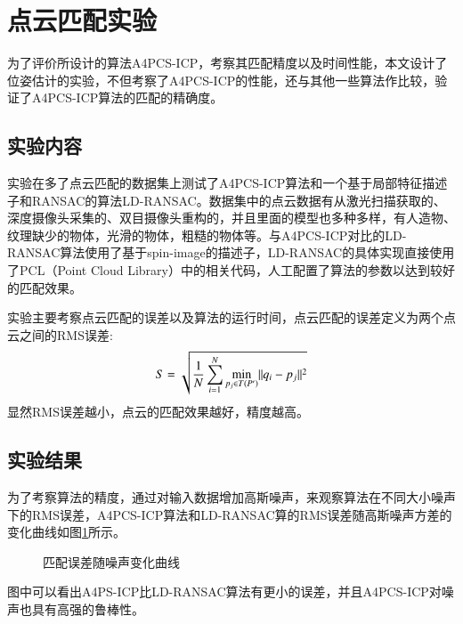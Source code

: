 \section{点云匹配实验}
为了评价所设计的算法A4PCS-ICP，考察其匹配精度以及时间性能，本文设计了位姿估计的实验，不但考察了A4PCS-ICP的性能，还与其他一些算法作比较，验证了A4PCS-ICP算法的匹配的精确度。

\subsection{实验内容}
实验在多了点云匹配的数据集上测试了A4PCS-ICP算法和一个基于局部特征描述子和RANSAC的算法LD-RANSAC\cite{li2005multiscale}。数据集中的点云数据有从激光扫描获取的、深度摄像头采集的、双目摄像头重构的，并且里面的模型也多种多样，有人造物、纹理缺少的物体，光滑的物体，粗糙的物体等。与A4PCS-ICP对比的LD-RANSAC算法使用了基于spin-image的描述子\cite{johnson1999using}，LD-RANSAC的具体实现直接使用了PCL（Point Cloud Library）中的相关代码，人工配置了算法的参数以达到较好的匹配效果。

实验主要考察点云匹配的误差以及算法的运行时间，点云匹配的误差定义为两个点云之间的RMS误差:
\begin{equation}
  S = \sqrt{\frac{1}{N}\sum_{i=1}^{N}{\min_{p_j\in T(P')}\lVert q_i-p_j\rVert^2}}
\end{equation}
显然RMS误差越小，点云的匹配效果越好，精度越高。

\subsection{实验结果}
为了考察算法的精度，通过对输入数据增加高斯噪声，来观察算法在不同大小噪声下的RMS误差，A4PCS-ICP算法和LD-RANSAC算的RMS误差随高斯噪声方差的变化曲线如图\ref{fig:err-noise}所示。
\begin{figure}[ht]
  \centering
  \caption{匹配误差随噪声变化曲线}
  \label{fig:err-noise}
\end{figure}
图中可以看出A4PS-ICP比LD-RANSAC算法有更小的误差，并且A4PCS-ICP对噪声也具有高强的鲁棒性。

